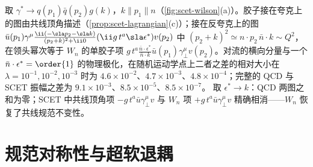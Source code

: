 \begin{example}[$W_n$ 的树图匹配]\label{ex:scet-wn-tree}
取 $\gamma^*\to q(p_1)\bar q(p_2)g(k)$，$k\parallel p_1\parallel n$（\cref{fig:scet-wilson}(a)）。胶子接在夸克上的图由共线顶角描述（\cref{prop:scet-lagrangian}(c)）；接在反夸克上的图 $\bar u(p_1)\gamma^\mu\frac{\ii(-\sla p_2-\sla k)}{(p_2+k)^2+\ii0}(\ii g\,t^a\sla\epsilon^*)v(p_2)$ 中 $(p_2+k)^2\simeq n\cdot p_2\,\bar n\cdot k\sim Q^2$，在领头幂次等于 $W_n$ 的单胶子项 $g\,t^a\frac{\bar n\cdot\epsilon^*}{\bar n\cdot k}\bar u(p_1)\gamma_\perp^\mu v(p_2)$。对流的横向分量与一个 $\bar n\cdot\epsilon^*=\order{1}$ 的物理极化，在随机运动学点上二者之差的相对大小在 $\lambda=10^{-1},10^{-2},10^{-3}$ 时为 $4.6\times10^{-2}$、$4.7\times10^{-3}$、$4.8\times10^{-4}$；完整的 QCD 与 SCET 振幅之差为 $9.1\times10^{-3}$、$8.5\times10^{-5}$、$8.5\times10^{-7}$。%
取 $\epsilon^*\to k$：QCD 两图之和为零；SCET 中共线顶角项 $-g\,t^a\bar u\gamma_\perp^\mu v$ 与 $W_n$ 项 $+g\,t^a\bar u\gamma_\perp^\mu v$ 精确相消——$W_n$ 恢复了共线规范不变性。
\end{example}

\section{规范对称性与超软退耦}\label{sec:scet-decoupling}


